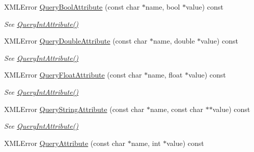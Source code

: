 \begin{DoxyCompactItemize}
X\+M\+L\+Error \mbox{\hyperlink{classtinyxml2_1_1XMLElement_a14c1bb77c39689838be01838d86ca872}{Query\+Bool\+Attribute}} (const char $\ast$name, bool $\ast$value) const
\begin{DoxyCompactList}\small\item\em See \mbox{\hyperlink{classtinyxml2_1_1XMLElement_a8a78bc1187c1c45ad89f2690eab567b1}{Query\+Int\+Attribute()}} \end{DoxyCompactList}\item 
\mbox{\label{classtinyxml2_1_1XMLElement_a5f0964e2dbd8e2ee7fce9beab689443c}} 
X\+M\+L\+Error \mbox{\hyperlink{classtinyxml2_1_1XMLElement_a5f0964e2dbd8e2ee7fce9beab689443c}{Query\+Double\+Attribute}} (const char $\ast$name, double $\ast$value) const
\begin{DoxyCompactList}\small\item\em See \mbox{\hyperlink{classtinyxml2_1_1XMLElement_a8a78bc1187c1c45ad89f2690eab567b1}{Query\+Int\+Attribute()}} \end{DoxyCompactList}\item 
\mbox{\label{classtinyxml2_1_1XMLElement_acd5eeddf6002ef90806af794b9d9a5a5}} 
X\+M\+L\+Error \mbox{\hyperlink{classtinyxml2_1_1XMLElement_acd5eeddf6002ef90806af794b9d9a5a5}{Query\+Float\+Attribute}} (const char $\ast$name, float $\ast$value) const
\begin{DoxyCompactList}\small\item\em See \mbox{\hyperlink{classtinyxml2_1_1XMLElement_a8a78bc1187c1c45ad89f2690eab567b1}{Query\+Int\+Attribute()}} \end{DoxyCompactList}\item 
\mbox{\label{classtinyxml2_1_1XMLElement_adb8ae765f98d0c5037faec48deea78bc}} 
X\+M\+L\+Error \mbox{\hyperlink{classtinyxml2_1_1XMLElement_adb8ae765f98d0c5037faec48deea78bc}{Query\+String\+Attribute}} (const char $\ast$name, const char $\ast$$\ast$value) const
\begin{DoxyCompactList}\small\item\em See \mbox{\hyperlink{classtinyxml2_1_1XMLElement_a8a78bc1187c1c45ad89f2690eab567b1}{Query\+Int\+Attribute()}} \end{DoxyCompactList}\item 
X\+M\+L\+Error \mbox{\hyperlink{classtinyxml2_1_1XMLElement_a5b7df3bed2b8954eabf227fa204522eb}{Query\+Attribute}} (const char $\ast$name, int $\ast$value) const
$$
\end{DoxyCompactItemize}
